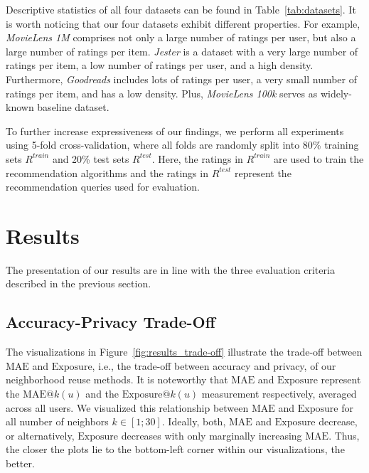 \documentclass[manuscript,review,anonymous]{acmart}
\begin{document}
Descriptive statistics of all four datasets can be found in Table~\ref{tab:datasets}.
It is worth noticing that our four datasets exhibit different properties.
For example, \emph{MovieLens 1M} comprises not only a large number of ratings per user, but also a large number of ratings per item.
\emph{Jester} is a dataset with a very large number of ratings per item, a low number of ratings per user, and a high density.
Furthermore, \emph{Goodreads} includes lots of ratings per user, a very small number of ratings per item, and has a low density.
Plus, \emph{MovieLens 100k} serves as widely-known baseline dataset.

To further increase expressiveness of our findings, we perform all experiments using 5-fold cross-validation, where all folds are randomly split into 80\% training sets $R^{train}$ and 20\% test sets $R^{test}$. Here, the ratings in $R^{train}$ are used to train the recommendation algorithms and the ratings in $R^{test}$ represent the recommendation queries used for evaluation.

\section{Results}
The presentation of our results are in line with the three evaluation criteria described in the previous section.

\subsection{Accuracy-Privacy Trade-Off}
The visualizations in Figure~\ref{fig:results_trade-off} illustrate the trade-off between $\mathrm{MAE}$ and $\mathrm{Exposure}$, i.e., the trade-off between accuracy and privacy, of our neighborhood reuse methods.
It is noteworthy that $\mathrm{MAE}$ and $\mathrm{Exposure}$ represent the $\mathrm{MAE}@k(u)$ and the $\mathrm{Exposure}@k(u)$ measurement respectively, averaged across all users. 
We visualized this relationship between $\mathrm{MAE}$ and $\mathrm{Exposure}$ for all number of neighbors $k \in [1; 30]$.
Ideally, both, $\mathrm{MAE}$ and $\mathrm{Exposure}$ decrease, or alternatively, $\mathrm{Exposure}$ decreases with only marginally increasing $\mathrm{MAE}$.
Thus, the closer the plots lie to the bottom-left corner within our visualizations, the better.
\end{document}
